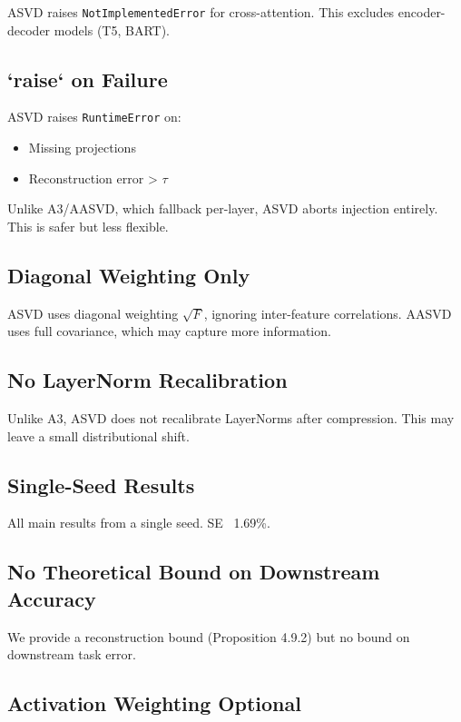 ASVD raises \texttt{NotImplementedError} for cross-attention. This excludes 
encoder-decoder models (T5, BART).

\subsection{`raise` on Failure}

ASVD raises \texttt{RuntimeError} on:
\begin{itemize}
\item Missing projections
\item Reconstruction error > $\tau$

\end{itemize}
Unlike A3/AASVD, which fallback per-layer, ASVD aborts injection entirely. 
This is safer but less flexible.

\subsection{Diagonal Weighting Only}

ASVD uses diagonal weighting $\sqrt{F}$, ignoring inter-feature 
correlations. AASVD uses full covariance, which may capture more 
information.

\subsection{No LayerNorm Recalibration}

Unlike A3, ASVD does not recalibrate LayerNorms after compression. This 
may leave a small distributional shift.

\subsection{Single-Seed Results}

All main results from a single seed. SE ~1.69\%.

\subsection{No Theoretical Bound on Downstream Accuracy}

We provide a reconstruction bound (Proposition 4.9.2) but no bound on 
downstream task error.

\subsection{Activation Weighting Optional}

